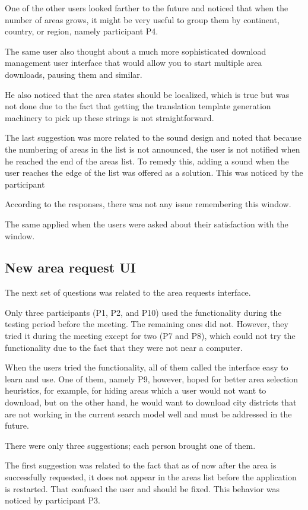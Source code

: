 \documentclass[nolof,digital]{fithesis3}
\begin{document}
One of the other users looked farther to the future and noticed that when the number of areas grows, it might be very useful to group them by continent, country, or region, namely participant P4.

The same user also thought about a much more sophisticated download management user interface that would allow you to start multiple area downloads, pausing them and similar.

He also noticed that the area states should be localized, which is true but was not done due to the fact that getting the translation template generation machinery to pick up these strings is not straightforward.

The last suggestion was more related to the sound design and noted that because the numbering of areas in the list is not announced, the user is not notified when he reached the end of the areas list. To remedy this, adding a sound when the user reaches the edge of the list was offered as a solution. This was noticed by the participant 

According to the responses, there was not any issue remembering this window.

The same applied when the users were asked about their satisfaction with the window.
\subsection{New area request UI}
The next set of questions was related to the area requests interface.

Only three participants (P1, P2, and P10) used the functionality during the testing period before the meeting. The remaining ones did not. However, they tried it during the meeting except for two (P7 and P8), which could not try the functionality due to the fact that they were not near a computer.

When the users tried the functionality, all of them called the interface easy to learn and use. One of them, namely P9, however, hoped for better area selection heuristics, for example, for hiding areas which a user would not want to download, but on the other hand, he would want to download city districts that are not working in the current search model well and must be addressed in the future.

There were only three suggestions; each person brought one of them.

The first suggestion was related to the fact that as of now after the area is successfully requested, it does not appear in the areas list before the application is restarted. That confused the user and should be fixed. This behavior was noticed by participant P3.
\end{document}
